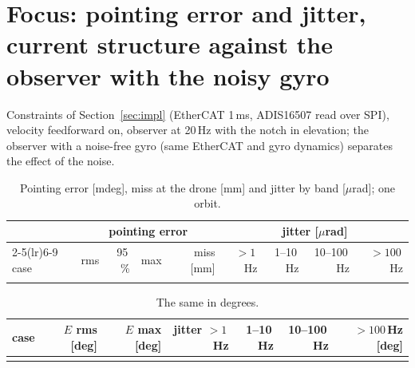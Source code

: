 \documentclass[10pt,a4paper]{article}
\numberwithin{equation}{section}
\begin{document}
\section{Focus: pointing error and jitter, current structure against the observer with the noisy gyro}\label{sec:focus}
Constraints of Section~\ref{sec:impl} (EtherCAT 1\,ms, ADIS16507 read over SPI), velocity feedforward on, observer at 20\,Hz with the notch in elevation; the observer with a noise-free gyro (same EtherCAT and gyro dynamics) separates the effect of the noise.
\begin{table}[H]\centering\small
\caption{Pointing error [mdeg], miss at the drone [mm] and jitter by band [$\mu$rad]; one orbit.}\label{tab:focus}
\begin{tabular}{lrrrrrrrr}\toprule
& \multicolumn{4}{c}{pointing error} & \multicolumn{4}{c}{jitter [$\mu$rad]} \\ \cmidrule(lr){2-5}\cmidrule(lr){6-9}
case & rms & 95\,\% & max & miss [mm] & $>1$\,Hz & 1--10\,Hz & 10--100\,Hz & $>100$\,Hz \\ \midrule
\\ \bottomrule
\end{tabular}\end{table}
\begin{table}[H]\centering\small
\caption{The same in degrees.}\label{tab:focusdeg}
\begin{tabular}{lrrrrrr}\toprule
case & $E$ rms [deg] & $E$ max [deg] & jitter $>1$\,Hz & 1--10\,Hz & 10--100\,Hz & $>100$\,Hz [deg] \\ \midrule
\\ \bottomrule
\end{tabular}\end{table}
\end{document}
